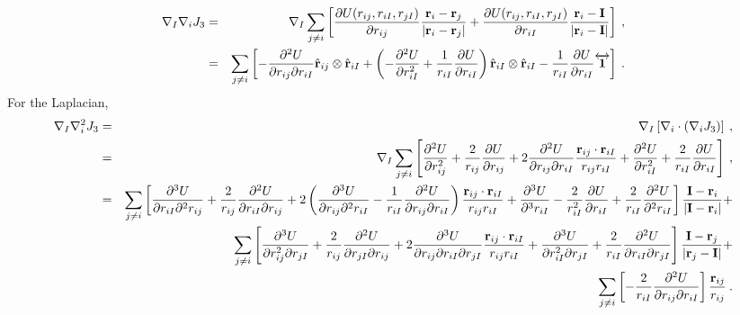 \begin{eqnarray}
\nabla_I \nabla_i J_3 & = & \nabla_I \sum_{j \neq i}
\left[\frac{\partial U(r_{ij}, r_{iI},r_{jI})}{\partial r_{ij}}
  \frac{\mathbf{r}_i - \mathbf{r}_j}{|\mathbf{r}_i - \mathbf{r}_j|} 
+ \frac{\partial U(r_{ij}, r_{iI},r_{jI})}{\partial r_{iI}}
  \frac{\mathbf{r}_i - \mathbf{I}}{|\mathbf{r}_i - \mathbf{I}|}  \right]\:, \\\nonumber 
& = & \sum_{j\neq i} \left[ -\frac{\partial^2 U}{\partial r_{ij} \partial r_{iI}} \hat{\mathbf{r}}_{ij} \otimes \hat{\mathbf{r}}_{iI} +
\left(-\frac{\partial^2 U}{\partial r_{iI}^2}  + \frac{1}{r_{iI}}\frac{\partial U}{\partial r_{iI}} \right) 
\hat{\mathbf{r}}_{iI} \otimes \hat{\mathbf{r}}_{iI} - \frac{1}{r_{iI}}\frac{\partial U}{\partial r_{iI}} \overleftrightarrow{\mathbf{1}}
\right]\:.
\end{eqnarray}
For the Laplacian,
\begin{eqnarray}
\nabla_I \nabla_i^2 J_3 & = & \nabla_I\left[\nabla_i \cdot \left(\nabla_i J_3\right)\right]\:, \\
& = & \nabla_I \sum_{j\neq i } \left[
\frac{\partial^2 U}{\partial r_{ij}^2} + \frac{2}{r_{ij}} \frac{\partial
  U}{\partial r_{ij}} + 2 \frac{\partial^2 U}{\partial r_{ij} \partial
  r_{iI}}\frac{\mathbf{r}_{ij}\cdot\mathbf{r}_{iI}}{r_{ij}r_{iI}} +\frac{\partial^2 U}{\partial
  r_{iI}^2}
+ \frac{2}{r_{iI}}\frac{\partial U}{\partial r_{iI}} \nonumber
\right]\:, \\
& = & \sum_{j\neq i } 
\left[ \frac{\partial^3 U}{\partial r_{iI} \partial^2 r_{ij}} +
\frac{2}{r_{ij}} \frac{\partial^2 U}{\partial r_{iI} \partial r_{ij}}
+ 2\left(\frac{\partial^3 U}{\partial r_{ij} \partial^2 r_{iI}} -\frac{1}{r_{iI}} \frac{\partial^2 U}{\partial r_{ij} \partial r_{iI}}\right)\frac{\mathbf{r}_{ij}\cdot\mathbf{r}_{iI}}{r_{ij}r_{iI}} + \frac{\partial^3 U}{\partial^3 r_{iI}} - \frac{2}{r_{iI}^2} \frac{\partial U}{ \partial r_{iI}} + \frac{2}{r_{iI}} \frac{\partial^2 U}{\partial^2 r_{iI}}
\right] \frac{\mathbf{I} - \mathbf{r}_i}{|\mathbf{I} - \mathbf{r}_i|} + \nonumber \\\nonumber 
 & & \sum_{j\neq i } \left[ \frac{\partial^3U}{\partial r_{ij}^2 \partial r_{jI}} + \frac{2}{r_{ij}}\frac{\partial^2 U}{\partial r_{jI} \partial r_{ij}} 
+ 2\frac{\partial^3 U}{\partial r_{ij} \partial r_{iI} \partial r_{jI}}\frac{\mathbf{r}_{ij}\cdot\mathbf{r}_{iI}}{r_{ij}r_{iI}}
+\frac{\partial^3 U}{\partial r_{iI}^2 \partial r_{jI}} + \frac{2}{r_{iI}}\frac{\partial^2 U}{\partial r_{iI} \partial r_{jI}} \right] 
\frac{\mathbf{I} - \mathbf{r}_j}{|\mathbf{r}_j - \mathbf{I}|} + \\\nonumber 
& & \sum_{j\neq i } \left[ -\frac{2}{r_{iI}}\frac{\partial^2 U}{\partial r_{ij} \partial r_{iI}}\right] \frac{\mathbf{r}_{ij}}{r_{ij}}\:.
\end{eqnarray}



